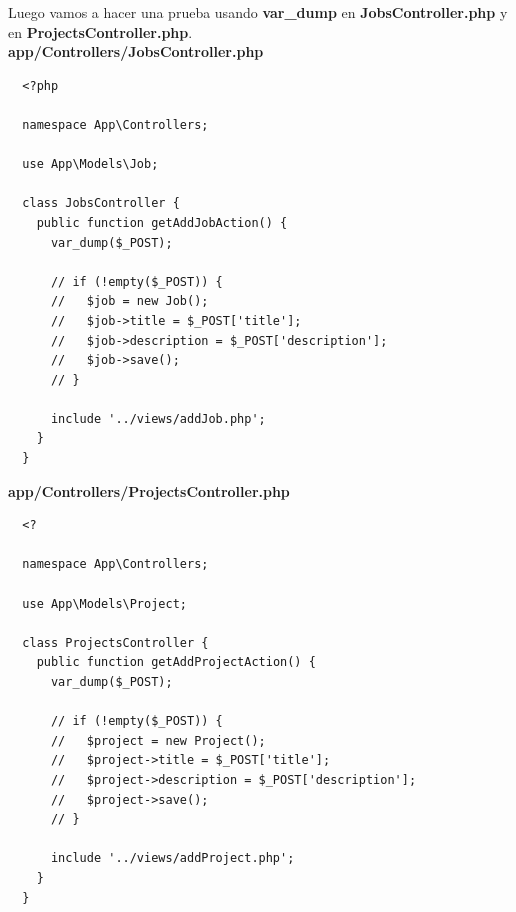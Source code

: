 \documentclass{article}
\begin{document}
Luego vamos a hacer una prueba usando \textbf{var\_dump} en
\textbf{JobsController.php} y en \textbf{ProjectsController.php}.\\

\textbf{app/Controllers/JobsController.php}
\begin{verbatim}
  <?php

  namespace App\Controllers;

  use App\Models\Job;

  class JobsController {
    public function getAddJobAction() {
      var_dump($_POST);

      // if (!empty($_POST)) {
      //   $job = new Job();
      //   $job->title = $_POST['title'];
      //   $job->description = $_POST['description'];
      //   $job->save();
      // }

      include '../views/addJob.php';
    }
  }
\end{verbatim}

\textbf{app/Controllers/ProjectsController.php}
\begin{verbatim}
  <?

  namespace App\Controllers;

  use App\Models\Project;

  class ProjectsController {
    public function getAddProjectAction() {
      var_dump($_POST);

      // if (!empty($_POST)) {
      //   $project = new Project();
      //   $project->title = $_POST['title'];
      //   $project->description = $_POST['description'];
      //   $project->save();
      // }

      include '../views/addProject.php';
    }
  }
\end{verbatim}
\end{document}

